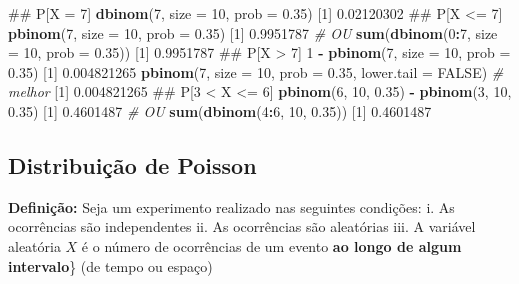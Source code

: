 \documentclass[10pt,a4paper]{book}
\newenvironment{Shaded}{\begin{snugshade}}{\end{snugshade}}
\newcommand{\KeywordTok}[1]{\textcolor[rgb]{0.13,0.29,0.53}{\textbf{#1}}}
\newcommand{\DataTypeTok}[1]{\textcolor[rgb]{0.13,0.29,0.53}{#1}}
\newcommand{\DecValTok}[1]{\textcolor[rgb]{0.00,0.00,0.81}{#1}}
\newcommand{\FloatTok}[1]{\textcolor[rgb]{0.00,0.00,0.81}{#1}}
\newcommand{\StringTok}[1]{\textcolor[rgb]{0.31,0.60,0.02}{#1}}
\newcommand{\CommentTok}[1]{\textcolor[rgb]{0.56,0.35,0.01}{\textit{#1}}}
\newcommand{\OtherTok}[1]{\textcolor[rgb]{0.56,0.35,0.01}{#1}}
\newcommand{\OperatorTok}[1]{\textcolor[rgb]{0.81,0.36,0.00}{\textbf{#1}}}
\newcommand{\NormalTok}[1]{#1}
\begin{document}
\begin{Shaded}
\begin{Highlighting}[]
\NormalTok{## P[X = 7]}
\KeywordTok{dbinom}\NormalTok{(}\DecValTok{7}\NormalTok{, }\DataTypeTok{size =} \DecValTok{10}\NormalTok{, }\DataTypeTok{prob =} \FloatTok{0.35}\NormalTok{)}
\NormalTok{[}\DecValTok{1}\NormalTok{] }\FloatTok{0.02120302}
\NormalTok{## P[X <= 7]}
\KeywordTok{pbinom}\NormalTok{(}\DecValTok{7}\NormalTok{, }\DataTypeTok{size =} \DecValTok{10}\NormalTok{, }\DataTypeTok{prob =} \FloatTok{0.35}\NormalTok{)}
\NormalTok{[}\DecValTok{1}\NormalTok{] }\FloatTok{0.9951787}
\CommentTok{# OU}
\KeywordTok{sum}\NormalTok{(}\KeywordTok{dbinom}\NormalTok{(}\DecValTok{0}\OperatorTok{:}\DecValTok{7}\NormalTok{, }\DataTypeTok{size =} \DecValTok{10}\NormalTok{, }\DataTypeTok{prob =} \FloatTok{0.35}\NormalTok{))}
\NormalTok{[}\DecValTok{1}\NormalTok{] }\FloatTok{0.9951787}
\NormalTok{## P[X > 7]}
\DecValTok{1} \OperatorTok{-}\StringTok{ }\KeywordTok{pbinom}\NormalTok{(}\DecValTok{7}\NormalTok{, }\DataTypeTok{size =} \DecValTok{10}\NormalTok{, }\DataTypeTok{prob =} \FloatTok{0.35}\NormalTok{)}
\NormalTok{[}\DecValTok{1}\NormalTok{] }\FloatTok{0.004821265}
\KeywordTok{pbinom}\NormalTok{(}\DecValTok{7}\NormalTok{, }\DataTypeTok{size =} \DecValTok{10}\NormalTok{, }\DataTypeTok{prob =} \FloatTok{0.35}\NormalTok{, }\DataTypeTok{lower.tail =} \OtherTok{FALSE}\NormalTok{) }\CommentTok{# melhor}
\NormalTok{[}\DecValTok{1}\NormalTok{] }\FloatTok{0.004821265}
\NormalTok{## P[3 < X <= 6]}
\KeywordTok{pbinom}\NormalTok{(}\DecValTok{6}\NormalTok{, }\DecValTok{10}\NormalTok{, }\FloatTok{0.35}\NormalTok{) }\OperatorTok{-}\StringTok{ }\KeywordTok{pbinom}\NormalTok{(}\DecValTok{3}\NormalTok{, }\DecValTok{10}\NormalTok{, }\FloatTok{0.35}\NormalTok{)}
\NormalTok{[}\DecValTok{1}\NormalTok{] }\FloatTok{0.4601487}
\CommentTok{# OU}
\KeywordTok{sum}\NormalTok{(}\KeywordTok{dbinom}\NormalTok{(}\DecValTok{4}\OperatorTok{:}\DecValTok{6}\NormalTok{, }\DecValTok{10}\NormalTok{, }\FloatTok{0.35}\NormalTok{))}
\NormalTok{[}\DecValTok{1}\NormalTok{] }\FloatTok{0.4601487}
\end{Highlighting}
\end{Shaded}

\subsection{Distribuição de Poisson}\label{distribuicao-de-poisson}

\textbf{Definição:} Seja um experimento realizado nas seguintes
condições: i. As ocorrências são independentes ii. As ocorrências são
aleatórias iii. A variável aleatória \(X\) é o número de ocorrências de
um evento \textbf{ao longo de algum intervalo}\} (de tempo ou espaço)
\end{document}

